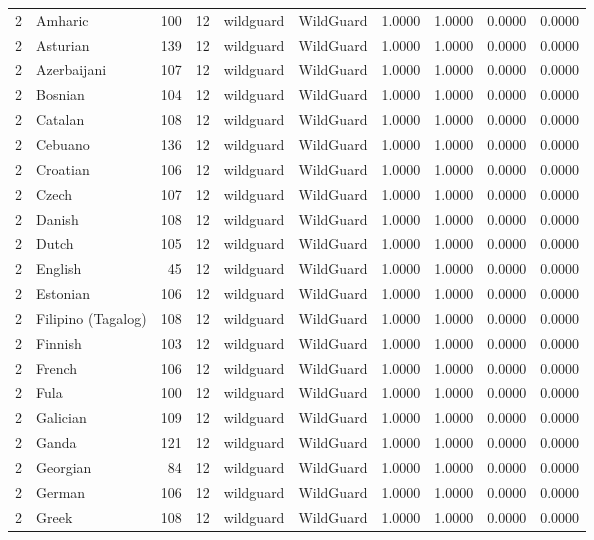 \begin{tabular}{rlrrllrrrr}
2 & Amharic & 100 & 12 & wildguard & WildGuard & 1.0000 & 1.0000 & 0.0000 & 0.0000 \\
2 & Asturian & 139 & 12 & wildguard & WildGuard & 1.0000 & 1.0000 & 0.0000 & 0.0000 \\
2 & Azerbaijani & 107 & 12 & wildguard & WildGuard & 1.0000 & 1.0000 & 0.0000 & 0.0000 \\
2 & Bosnian & 104 & 12 & wildguard & WildGuard & 1.0000 & 1.0000 & 0.0000 & 0.0000 \\
2 & Catalan & 108 & 12 & wildguard & WildGuard & 1.0000 & 1.0000 & 0.0000 & 0.0000 \\
2 & Cebuano & 136 & 12 & wildguard & WildGuard & 1.0000 & 1.0000 & 0.0000 & 0.0000 \\
2 & Croatian & 106 & 12 & wildguard & WildGuard & 1.0000 & 1.0000 & 0.0000 & 0.0000 \\
2 & Czech & 107 & 12 & wildguard & WildGuard & 1.0000 & 1.0000 & 0.0000 & 0.0000 \\
2 & Danish & 108 & 12 & wildguard & WildGuard & 1.0000 & 1.0000 & 0.0000 & 0.0000 \\
2 & Dutch & 105 & 12 & wildguard & WildGuard & 1.0000 & 1.0000 & 0.0000 & 0.0000 \\
2 & English & 45 & 12 & wildguard & WildGuard & 1.0000 & 1.0000 & 0.0000 & 0.0000 \\
2 & Estonian & 106 & 12 & wildguard & WildGuard & 1.0000 & 1.0000 & 0.0000 & 0.0000 \\
2 & Filipino (Tagalog) & 108 & 12 & wildguard & WildGuard & 1.0000 & 1.0000 & 0.0000 & 0.0000 \\
2 & Finnish & 103 & 12 & wildguard & WildGuard & 1.0000 & 1.0000 & 0.0000 & 0.0000 \\
2 & French & 106 & 12 & wildguard & WildGuard & 1.0000 & 1.0000 & 0.0000 & 0.0000 \\
2 & Fula & 100 & 12 & wildguard & WildGuard & 1.0000 & 1.0000 & 0.0000 & 0.0000 \\
2 & Galician & 109 & 12 & wildguard & WildGuard & 1.0000 & 1.0000 & 0.0000 & 0.0000 \\
2 & Ganda & 121 & 12 & wildguard & WildGuard & 1.0000 & 1.0000 & 0.0000 & 0.0000 \\
2 & Georgian & 84 & 12 & wildguard & WildGuard & 1.0000 & 1.0000 & 0.0000 & 0.0000 \\
2 & German & 106 & 12 & wildguard & WildGuard & 1.0000 & 1.0000 & 0.0000 & 0.0000 \\
2 & Greek & 108 & 12 & wildguard & WildGuard & 1.0000 & 1.0000 & 0.0000 & 0.0000 \\

\end{tabular}
